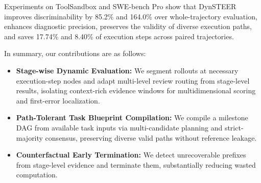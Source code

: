 Experiments on ToolSandbox and SWE-bench Pro show that DynSTEER improves discriminability by 85.2\% and 164.0\% over whole-trajectory evaluation, enhances diagnostic precision, preserves the validity of diverse execution paths, and saves 17.74\% and 8.40\% of execution steps across paired trajectories.

In summary, our contributions are as follows:
\begin{itemize}[leftmargin=*,itemsep=1.5pt,topsep=1pt]
    \item \textbf{Stage-wise Dynamic Evaluation:} We segment rollouts at necessary execution-step nodes and adapt multi-level review routing from stage-level results, isolating context-rich evidence windows for multidimensional scoring and first-error localization.
    \item \textbf{Path-Tolerant Task Blueprint Compilation:} We compile a milestone DAG from available task inputs via multi-candidate planning and strict-majority consensus, preserving diverse valid paths without reference leakage.
    \item \textbf{Counterfactual Early Termination:} We detect unrecoverable prefixes from stage-level evidence and terminate them, substantially reducing wasted computation.
\end{itemize}
